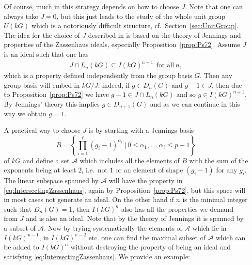 \documentclass[11pt, a4paper]{amsart}
\theoremstyle{definition}
\begin{document}
Of course, much in this strategy depends on how to choose $J$. Note that one can always take $J = 0$, but this just leads to the study of the whole unit group $U(kG)$ which is a notoriously difficult structure, cf.\ Section~\ref{sec:UnitGroup}. The idea for the choice of $J$ described in \cite{HertweckSoriano06} is based on the theory of Jennings and properties of the Zassenhaus ideals, especially Proposition~\ref{prop:Ps72}. Assume $J$ is an ideal such that one has 
\begin{align}\label{eq:IntersectingZassenhaus}
J \cap L_n(kG) \subseteq I(kG)^{n+1} \ \ \text{for all} \ n, 
\end{align}
which is a property defined independently from the group basis $G$. Then any group basis will embed in $kG/J$: indeed, if $g \in D_n(G)$ and $g-1 \in J$, then due to Proposition~\ref{prop:Ps72} we have $g-1 \in J \cap L_n(kG)$ and so $g \in I(kG)^{n+1}$. By Jennings' theory this implies $g \in D_{n+1}(G)$ and as we can continue in this way we obtain $g=1$. 

A practical way to choose $J$ is by starting with a Jennings basis 
\[B = \left\{\prod_{i=1}^\ell (g_i-1)^{\alpha_i} \ | \ 0 \leq \alpha_1,...,\alpha_\ell \leq p-1 \right\}\]
of $kG$ and define a set $\mathcal{A}$ which includes all the elements of $B$ with the sum of the exponents being at least $2$, i.e.\ not $1$ or an element of shape $(g_i-1)$ for any $g_i$. The linear subspace spanned by $\mathcal{A}$ will have the property in \eqref{eq:IntersectingZassenhaus}, again by Proposition~\ref{prop:Ps72}, but this space will in most cases not generate an ideal. On the other hand if $n$ is the minimal integer such that $D_n(G)=1$, then $I(kG)^n$ also has all the properties we demand from $J$ and is also an ideal. Note that by the theory of Jennings it is spanned by a subset of $\mathcal{A}$. Now by trying systematically the elements of $\mathcal{A}$ which lie in $I(kG)^{n-1}$, in $I(kG)^{n-2}$ etc. one can find the maximal subset of $\mathcal{A}$ which can be added to $I(kG)^n$ without destroying the property of being an ideal and satisfying \eqref{eq:IntersectingZassenhaus}. We provide an example:
\end{document}
